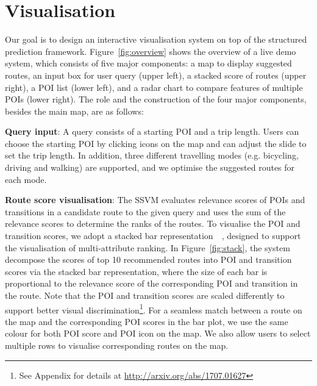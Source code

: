 \section{Visualisation}
Our goal is to design an interactive visualisation system on top of the structured prediction framework.
Figure~\ref{fig:overview} shows the overview of a live demo system, which consists of five major components: a map to display suggested routes, an input box for user query (upper left), a stacked score of routes (upper right), a POI list (lower left), and a radar chart to compare features of multiple POIs (lower right). 
The role and the construction of the four major components, besides the main map, are as follows:

\textbf{Query input}: A query consists of a starting POI and a trip length. 
Users can choose the starting POI by clicking icons on the map and can adjust the slide to set the trip length. 
In addition, three different travelling modes (e.g. bicycling, driving and walking) are supported, 
and we optimise the suggested routes for each mode.

\textbf{Route score visualisation}: 
The SSVM evaluates relevance scores of POIs and transitions in a candidate route to the given query and uses the sum of the relevance scores to determine the ranks of the routes.
To visualise the POI and transition scores, we adopt a stacked bar representation~~\cite{gratzl2013lineup}, designed to support the visualisation of multi-attribute ranking.
In Figure~\ref{fig:stack}, the system decompose the scores of top 10 recommended routes into POI and transition scores via the stacked bar representation, where the size of each bar is proportional to the relevance score of the corresponding POI and transition in the route.
Note that the POI and transition scores are scaled differently to support better visual discrimination\footnote{See Appendix for details at \url{http://arxiv.org/abs/1707.01627}}.
For a seamless match between a route on the map and the corresponding POI scores in the bar plot,
we use the same colour for both POI score and POI icon on the map.
We also allow users to select multiple rows to visualise corresponding routes on the map.

